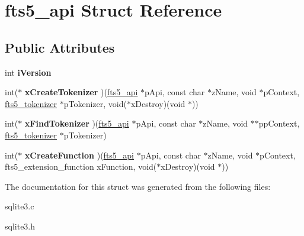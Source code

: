 \hypertarget{structfts5__api}{}\section{fts5\+\_\+api Struct Reference}
\label{structfts5__api}
\subsection*{Public Attributes}
\begin{DoxyCompactItemize}
\item 
int {\bfseries i\+Version}\hypertarget{structfts5__api_a3c338289abb33e1805da870172956a7c}{}\label{structfts5__api_a3c338289abb33e1805da870172956a7c}

\item 
int($\ast$ {\bfseries x\+Create\+Tokenizer} )(\hyperlink{structfts5__api}{fts5\+\_\+api} $\ast$p\+Api, const char $\ast$z\+Name, void $\ast$p\+Context, \hyperlink{structfts5__tokenizer}{fts5\+\_\+tokenizer} $\ast$p\+Tokenizer, void($\ast$x\+Destroy)(void $\ast$))\hypertarget{structfts5__api_a6cb9929558ff13c7b5a30292eb5aea7c}{}\label{structfts5__api_a6cb9929558ff13c7b5a30292eb5aea7c}

\item 
int($\ast$ {\bfseries x\+Find\+Tokenizer} )(\hyperlink{structfts5__api}{fts5\+\_\+api} $\ast$p\+Api, const char $\ast$z\+Name, void $\ast$$\ast$pp\+Context, \hyperlink{structfts5__tokenizer}{fts5\+\_\+tokenizer} $\ast$p\+Tokenizer)\hypertarget{structfts5__api_aa232f72a0d7c7205fbd0dc6818e24aee}{}\label{structfts5__api_aa232f72a0d7c7205fbd0dc6818e24aee}

\item 
int($\ast$ {\bfseries x\+Create\+Function} )(\hyperlink{structfts5__api}{fts5\+\_\+api} $\ast$p\+Api, const char $\ast$z\+Name, void $\ast$p\+Context, fts5\+\_\+extension\+\_\+function x\+Function, void($\ast$x\+Destroy)(void $\ast$))\hypertarget{structfts5__api_aa932ba45865c10b49592920b9610db93}{}\label{structfts5__api_aa932ba45865c10b49592920b9610db93}

\end{DoxyCompactItemize}


The documentation for this struct was generated from the following files\+:\begin{DoxyCompactItemize}
\item 
sqlite3.\+c\item 
sqlite3.\+h\end{DoxyCompactItemize}
